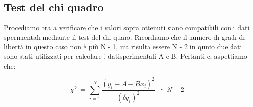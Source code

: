\subsection{Test del chi quadro}
Procediamo ora a verificare che i valori sopra ottenuti siano compatibili con i dati sperimentali mediante il test del chi quaro. Ricordiamo che il numero di gradi di libertà in questo caso non è più N - 1, ma risulta essere N - 2 in qunto due dati sono stati utilizzati per calcolare i datisperimentali A e B. Pertanti ci aspettiamo che:

\begin{equation*}
	\chi^2 \,=\, \sum_{i=1}^{N} \frac{(y_i - A - Bx_i)^2}{(\delta y_i)^2} \,\simeq\, N - 2
\end{equation*}
%






